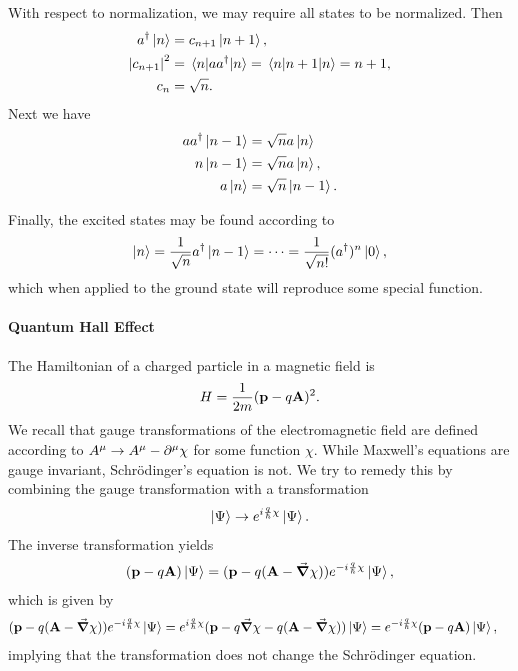 With respect to normalization, we may require all states to be normalized. Then
\begin{align*}
	\adj{a}\ket{n}      &= c_{n + 1}\ket{n + 1}, \\
	\abs{c_{n + 1}}^{2} &= \expval{a\adj{a}}{n} = \expval{n + 1}{n} = n + 1, \\
	c_{n}               &= \sqrt{n}.
\end{align*}
Next we have
\begin{align*}
	a\adj{a}\ket{n - 1} &= \sqrt{n}a\ket{n} \\
	n\ket{n - 1}        &= \sqrt{n}a\ket{n}, \\
	a\ket{n}            &= \sqrt{n}\ket{n - 1}.
\end{align*}

Finally, the excited states may be found according to
\begin{align*}
	\ket{n} = \frac{1}{\sqrt{n}}\adj{a}\ket{n - 1} = \dots = \frac{1}{\sqrt{n!}}(\adj{a})^{n}\ket{0},
\end{align*}
which when applied to the ground state will reproduce some special function.

\paragraph{Quantum Hall Effect}
The Hamiltonian of a charged particle in a magnetic field is
\begin{align*}
	H = \frac{1}{2m}(\vb{p} - q\vb{A})^{2}.
\end{align*}
We recall that gauge transformations of the electromagnetic field are defined according to $A^{\mu} \to A^{\mu} - \del[\mu]{}{\chi}$ for some function $\chi$. While Maxwell's equations are gauge invariant, Schrödinger's equation is not. We try to remedy this by combining the gauge transformation with a transformation
\begin{align*}
	\ket{\Psi} \to e^{i\frac{q}{\hbar}\chi}\ket{\Psi}.
\end{align*}
The inverse transformation yields
\begin{align*}
	(\vb{p} - q\vb{A})\ket{\Psi} = (\vb{p} - q(\vb{A} - \grad{\chi}))e^{-i\frac{q}{\hbar}\chi}\ket{\Psi},
\end{align*}
which is given by
\begin{align*}
	(\vb{p} - q(\vb{A} - \grad{\chi}))e^{-i\frac{q}{\hbar}\chi}\ket{\Psi} &= e^{i\frac{q}{\hbar}\chi}(\vb{p} - q\grad{\chi} - q(\vb{A} - \grad{\chi}))\ket{\Psi} = e^{-i\frac{q}{\hbar}\chi}(\vb{p} - q\vb{A})\ket{\Psi},
\end{align*}
implying that the transformation does not change the Schrödinger equation.

